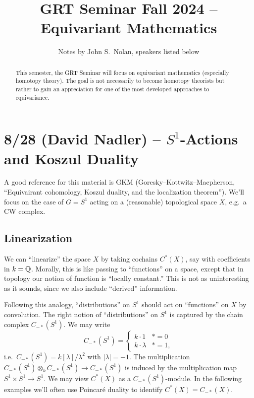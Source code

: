 \documentclass{article}
\title{GRT Seminar Fall 2024 -- Equivariant Mathematics}
\author{Notes by John S.\ Nolan, speakers listed below}
\begin{document}
\maketitle

\begin{abstract}
	This semester, the GRT Seminar will focus on equivariant mathematics (especially homotopy theory).
  The goal is not necessarily to become homotopy theorists but rather to gain an appreciation for one of the most developed approaches to equivariance.
\end{abstract}

\tableofcontents

\section{8/28 (David Nadler) -- $S^1$-Actions and Koszul Duality}

A good reference for this material is GKM (Goresky--Kottwitz--Macpherson, ``Equivairant cohomology, Koszul duality, and the localization theorem'').
We'll focus on the case of $G = S^1$ acting on a (reasonable) topological space $X$, e.g.\ a CW complex.

\subsection{Linearization}

We can ``linearize'' the space $X$ by taking cochains $C^*(X)$, say with coefficients in $k = \mathbb{Q}$.
Morally, this is like passing to ``functions'' on a space, except that in topology our notion of function is ``locally constant.''
This is not as uninteresting as it sounds, since we also include ``derived'' information.

Following this analogy, ``distributions'' on $S^1$ should act on ``functions'' on $X$ by convolution.
The right notion of ``distributions'' on $S^1$ is captured by the chain complex $C_{-*}(S^1)$.
We may write
\[
  C_{-*}(S^1) = \begin{cases}
    k \cdot 1 & * = 0 \\
    k \cdot \lambda & * = 1,
  \end{cases}
\]
i.e.\ $C_{-*}(S^1) = k[\lambda] / \lambda^2$ with $|\lambda| = -1$.
The multiplication $C_{-*}(S^1) \otimes_k C_{-*}(S^1) \to C_{-*}(S^1)$ is induced by the multiplication map $S^1 \times S^1 \to S^1$.
We may view $C^*(X)$ as a $C_{-*}(S^1)$-module.
In the following examples we'll often use Poincar\'e duality to identify $C^*(X) = C_{-*}(X)$.
\end{document}
